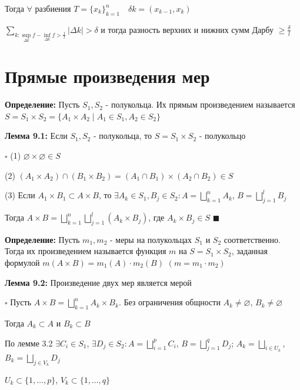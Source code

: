 \documentclass[a4paper]{report}
\begin{document}
Тогда $\forall$ разбиения $T=\{x_k\}_{k=1}^n\quad \delta k=(x_{k-1},x_k)$

\noindent$\sum\limits_{k\colon\sup\limits_{\Delta k}f-\inf\limits_{\Delta k}f>\frac1l}|\Delta k|>\delta$ и тогда разность верхних и нижних сумм Дарбу $\ge\frac{\delta}{l}$







\chapter{Прямые произведения мер}

\noindent\textbf{Определение:} Пусть $S_1,S_2$ - полукольца. Их прямым произведением называется $S=S_1\times S_2=\{A_1\times A_2\mid A_1\in S_1,A_2\in S_2\}$
\bigskip

\noindent\textbf{Лемма 9.1:} Если $S_1,S_2$ - полукольца, то $S=S_1\times S_2$ - полукольцо

\noindent $\square$ (1) $\varnothing\times\varnothing\in S$

(2) $(A_1\times A_2)\cap(B_1\times B_2)=(A_1\cap B_1)\times(A_2\cap B_2)\in S$

(3) Если $A_1\times B_1\subset A\times B$, то $\exists A_k\in S_1,B_j\in S_2\colon A=\bigsqcup\limits_{k=1}^n A_k$, $B=\bigsqcup\limits_{j=1}^l B_j$

Тогда $A\times B=\bigsqcup\limits_{k=1}^n\bigsqcup\limits_{j=1}^l(A_k\times B_j)$, где $A_k\times B_j\in S$ $\blacksquare$
\bigskip

\noindent\textbf{Определение:} Пусть $m_1,m_2$ - меры на полукольцах $S_1$ и $S_2$ соответственно. Тогда их произведением называется функция $m$ на $S=S_1\times S_2$, заданная формулой $m(A\times B)=m_1(A)\cdot m_2(B)$  $(m=m_1\cdot m_2)$
\bigskip

\noindent\textbf{Лемма 9.2:} Произведение двух мер является мерой

\noindent $\square$ Пусть $A\times B=\bigsqcup\limits_{k=1}^n A_k\times B_k$. Без ограничения общности $A_k\ne\varnothing$, $B_k\ne\varnothing$

Тогда $A_k\subset A$ и $B_k\subset B$

По лемме 3.2 $\exists C_i\in S_1$, $\exists D_j\in S_2\colon A=\bigsqcup\limits_{i=1}^p C_i$, $B=\bigsqcup\limits_{j=1}^q D_j$; $A_k=\bigsqcup\limits_{i\in U_k}$, 
$B_k=\bigsqcup\limits_{j\in V_k}D_j$

$U_k\subset\{1,\ldots,p\}$, $V_k\subset\{1,\ldots,q\}$
\end{document}
